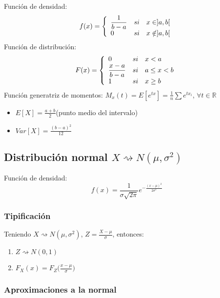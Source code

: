 \documentclass[11pt,twoside,titlepage,a4paper]{article}
\theoremstyle{definition}
\theoremstyle{plain_rojo}
\theoremstyle{remark}
\begin{document}
Función de densidad:
\begin{equation*}
f(x)=\left\{
	\begin{array}{l c l}
	\displaystyle\frac{1}{b-a} & si & x\in]a,b[\\
	0 & si & x\notin]a,b[
	\end{array}
\right.
\end{equation*}
Función de distribución:
\begin{equation*}
F(x)=\left\{
	\begin{array}{l c l}
	0 & si & x<a \\
	\displaystyle\frac{x-a}{b-a} & si & a\leq x<b \\
	1 & si & x\geq b
	\end{array}
\right.
\end{equation*}
Función generatriz de momentos: $M_x(t)=E[e^{tx}]=\frac 1n\sum e^{tx_i}$, $\forall t\in\mathbb{R}$
\begin{multicols}{2}
	\begin{itemize}[label={}]
		\item $E[X]=\displaystyle\frac{a+b}{2}$\quad(punto medio del intervalo)
		\item $Var[X]=\displaystyle\frac{(b-a)^2}{12}$
	\end{itemize}
\end{multicols}

\subsection{Distribución normal $X\rightsquigarrow N(\mu,\sigma^2)$}

Función de densidad:
$$f(x)=\frac{1}{\sigma\sqrt{2\pi}}e^{-\displaystyle\frac{(x-\mu)^2}{2\sigma^2}}$$

\subsubsection{Tipificación}

Teniendo $X\rightsquigarrow N(\mu,\sigma^2)$, $Z=\displaystyle\frac{X-\mu}{\sigma}$, entonces:
\begin{enumerate}[font={\color{rojooscuro}\bfseries}]
	\item $Z\rightsquigarrow N(0,1)$
	\item $F_X(x)=F_Z\Big(\displaystyle\frac{x-\mu}{\sigma}\Big)$
\end{enumerate}

\subsubsection{Aproximaciones a la normal}
\end{document}
